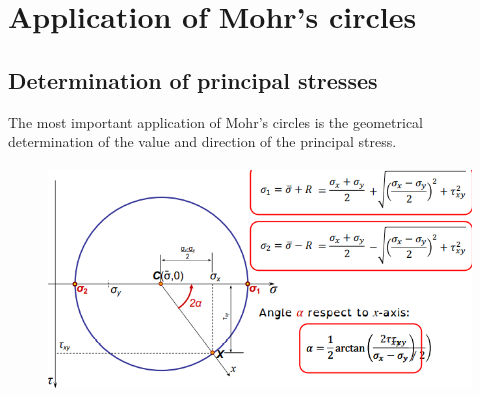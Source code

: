 \documentclass[class=report, crop=false, 12pt,a4paper]{standalone}
\begin{document}
\section{Application of Mohr's circles}
\subsection{Determination of principal stresses}
The most important application of Mohr's circles is the geometrical determination of the value and direction of the principal stress. 
\begin{figure}[H]
    \centering
    \includegraphics[height = 6cm]{../img/diagram57.png}
    \caption{}
\end{figure}
\end{document}
